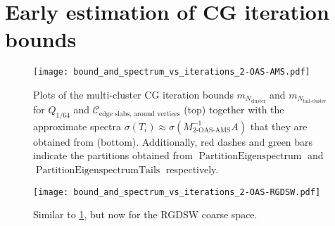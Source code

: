 \section{Early estimation of CG iteration bounds}\label{sec:early_estimation_of_iterations}
\begin{figure}[H]
    \centering
    \texttt{[image: bound\_and\_spectrum\_vs\_iterations\_2-OAS-AMS.pdf]}
    \caption{Plots of the multi-cluster CG iteration bounds $m_{N_{\text{cluster}}}$ and $m_{N_{\text{tail-cluster}}}$ for $Q_{1/64}$ and $\mathcal{C}_{\text{edge slabs, around vertices}}$ (top) together with the approximate spectra $\sigma(T_i) \approx \sigma(M^{-1}_{\text{2-OAS-AMS}}A)$ that they are obtained from (bottom). Additionally, red dashes and green bars indicate the partitions obtained from $\operatorname{PartitionEigenspectrum}$ and $\operatorname{PartitionEigenspectrumTails}$ respectively.}
    \label{fig:bound_and_spectrum_vs_iterations_2-OAS-AMS}
\end{figure}
\begin{figure}[H]
    \centering
    \texttt{[image: bound\_and\_spectrum\_vs\_iterations\_2-OAS-RGDSW.pdf]}
    \caption{Similar to \cref{fig:bound_and_spectrum_vs_iterations_2-OAS-AMS}, but now for the RGDSW coarse space.}
    \label{fig:bound_and_spectrum_vs_iterations_2-OAS-RGDSW}
\end{figure}




